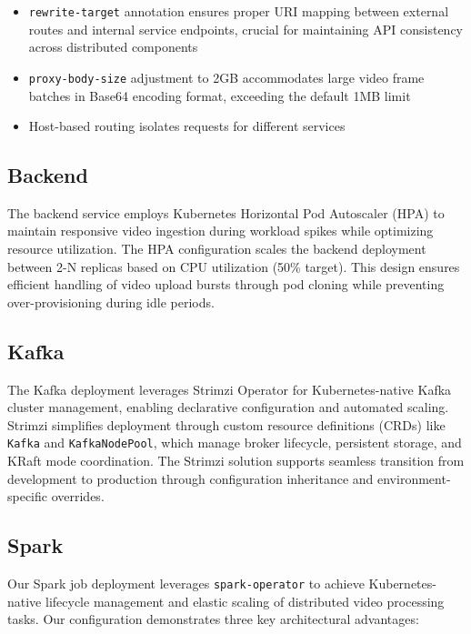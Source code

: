 \documentclass[10pt,a4paper]{article}
\begin{document}
\begin{itemize}
    \item \texttt{rewrite-target} annotation ensures proper URI mapping between external routes and internal service endpoints, crucial for maintaining API consistency across distributed components

    \item \texttt{proxy-body-size} adjustment to 2GB accommodates large video frame batches in Base64 encoding format, exceeding the default 1MB limit

    \item Host-based routing isolates requests for different services
\end{itemize}

\subsection{Backend}
The backend service employs Kubernetes Horizontal Pod Autoscaler (HPA) \cite{kubernetes_hpa} to maintain responsive video ingestion during workload spikes while optimizing resource utilization. The HPA configuration scales the backend deployment between 2-N replicas based on CPU utilization (50\% target). This design ensures efficient handling of video upload bursts through pod cloning while preventing over-provisioning during idle periods.

\subsection{Kafka}
The Kafka deployment leverages Strimzi Operator \cite{strimzi} for Kubernetes-native Kafka cluster management, enabling declarative configuration and automated scaling. Strimzi simplifies deployment through custom resource definitions (CRDs) like \texttt{Kafka} and \texttt{KafkaNodePool}, which manage broker lifecycle, persistent storage, and KRaft mode coordination. The Strimzi solution supports seamless transition from development to production through configuration inheritance and environment-specific overrides.

\subsection{Spark}
Our Spark job deployment leverages \texttt{spark-operator} \cite{spark_operator} to achieve Kubernetes-native lifecycle management and elastic scaling of distributed video processing tasks. Our configuration demonstrates three key architectural advantages:
\end{document}
